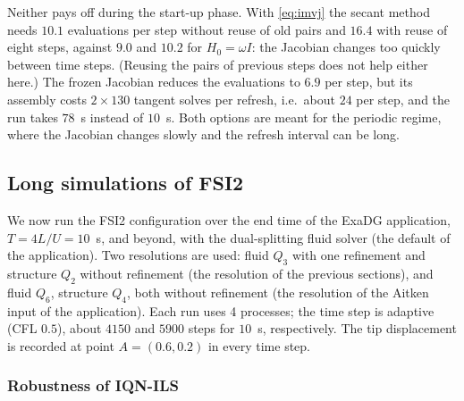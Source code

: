 \documentclass[11pt,a4paper]{article}
\theoremstyle{definition}
\theoremstyle{remark}
\begin{document}
Neither pays off during the start-up phase. With \eqref{eq:imvj} the secant method needs
$10.1$ evaluations per step without reuse of old pairs and $16.4$ with reuse of eight steps, against
$9.0$ and $10.2$ for $H_0=\omega I$: the Jacobian changes too quickly between time steps. (Reusing
the pairs of previous steps does not help either here.) The frozen Jacobian reduces the evaluations
to $6.9$ per step, but its assembly costs $2\times130$ tangent solves per refresh, i.e.\ about
$24$ per step, and the run takes $78$~s instead of $10$~s. Both options are meant for the periodic
regime, where the Jacobian changes slowly and the refresh interval can be long.

\subsection{Long simulations of FSI2}\label{sec:longruns}

We now run the FSI2 configuration over the end time of the ExaDG application, $T=4L/U=10$~s,
and beyond, with the dual-splitting fluid solver (the default of the application). Two
resolutions are used: fluid $Q_3$ with one refinement and structure $Q_2$ without refinement (the
resolution of the previous sections), and fluid $Q_6$, structure $Q_4$, both without refinement
(the resolution of the Aitken input of the application). Each run uses 4 processes; the time step
is adaptive (CFL $0.5$), about $4150$ and $5900$ steps for $10$~s, respectively. The tip
displacement is recorded at point $A=(0.6,0.2)$ in every time step.

\subsubsection{Robustness of IQN-ILS}\label{sec:iqn_fix}
\end{document}
